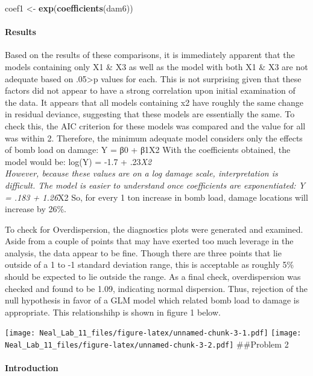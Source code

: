 \documentclass[]{article}
\newenvironment{Shaded}{\begin{snugshade}}{\end{snugshade}}
\newcommand{\KeywordTok}[1]{\textcolor[rgb]{0.13,0.29,0.53}{\textbf{#1}}}
\newcommand{\StringTok}[1]{\textcolor[rgb]{0.31,0.60,0.02}{#1}}
\newcommand{\NormalTok}[1]{#1}
\let\oldparagraph\paragraph
\renewcommand{\paragraph}[1]{\oldparagraph{#1}\mbox{}}
\begin{document}
\begin{Shaded}
\begin{Highlighting}[]
\NormalTok{coef1 <-}\StringTok{ }\KeywordTok{exp}\NormalTok{(}\KeywordTok{coefficients}\NormalTok{(dam6))}
\end{Highlighting}
\end{Shaded}

\paragraph{Results}\label{results}

Based on the results of these comparisons, it is immediately apparent
that the models containing only X1 \& X3 as well as the model with both
X1 \& X3 are not adequate based on .05\textgreater{}p values for each.
This is not surprising given that these factors did not appear to have a
strong correlation upon initial examination of the data. It appears that
all models containing x2 have roughly the same change in residual
deviance, suggesting that these models are essentially the same. To
check this, the AIC criterion for these models was compared and the
value for all was within 2. Therefore, the minimum adequate model
considers only the effects of bomb load on damage: Y = β0 + β1X2 With
the coefficients obtained, the model would be: log(Y) = -1.7 +
.23\emph{X2\\
However, because these values are on a log damage scale, interpretation
is difficult. The model is easier to understand once coefficients are
exponentiated: Y = .183 + 1.26}X2 So, for every 1 ton increase in bomb
load, damage locations will increase by 26\%.

To check for Overdispersion, the diagnostics plots were generated and
examined. Aside from a couple of points that may have exerted too much
leverage in the analysis, the data appear to be fine. Though there are
three points that lie outside of a 1 to -1 standard deviation range,
this is acceptable as roughly 5\% should be expected to lie outside the
range. As a final check, overdispersion was checked and found to be
1.09, indicating normal dispersion. Thus, rejection of the null
hypothesis in favor of a GLM model which related bomb load to damage is
appropriate. This relationshihp is shown in figure 1 below.

\texttt{[image: Neal\_Lab\_11\_files/figure-latex/unnamed-chunk-3-1.pdf]}
\texttt{[image: Neal\_Lab\_11\_files/figure-latex/unnamed-chunk-3-2.pdf]}
\#\#Problem 2

\paragraph{Introduction}\label{introduction-1}
\end{document}
